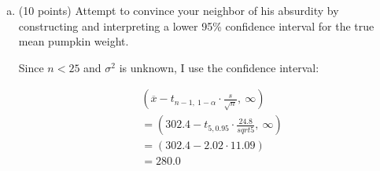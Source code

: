 \documentclass{article}\usepackage{graphicx, color}
\providecommand{\ov}[1]{\overline{#1}}
\numberwithin{equation}{section}
\begin{document}
\begin{flushleft}
\begin{enumerate}[1. ]
\begin{enumerate}[a. ]
{\color{red}

First, I calculate the mean weight to be:
\begin{align*}
\ov{x} &= \frac{1}{6} (311.0 + 271.1 + \cdots + 304.4) = 302.3
\intertext{and the standard deviation is:}
s &= \frac{1}{6-1}[(311.0 - 302.3)^2 + (271.1 - 302.3)^2 + \cdots + (304.4 - 302.3)^2] = 24.8
\end{align*}

And here is the hypothesis test:

\begin{enumerate}[1. ]
\item $H_0: \mu =240 $, $H_a: \mu \ne 240$, where $\mu $ is the true mean combined pumpkin weight.
\item $\alpha = 0.05$
\item I use the test statistic:
\begin{align*}
K = \frac{\ov{x} - 240}{s/\sqrt{n}}
\end{align*}
I assume the combined pumpkin weights are iid $N(\mu, \sigma^2)$. Under the additional assumption that $H_0$ is true, $K \sim t_{n - 1} = t_5$. I will reject $H_0$ if $|K| > t_{n - 1, 1 - \alpha/2} = t_{5, 0.975} = 2.57$
\item The moment of truth:
\begin{align*}
K &= \frac{302.3 - 240}{24.8/\sqrt{6}} = 6.15 \\
\end{align*} 
\item With $|K| = 6.15 > 2.57= t_{n - 1, 1 - \alpha/2}$, I reject $H_0$. 
\item There is enough evidence to conclude that your neighbor's true mean combined pumpkin weight (per year) is different from 240 lb.
\end{enumerate}

}




\item (10 points) Attempt to convince your neighbor of his absurdity by constructing and interpreting a lower 95\% confidence interval for the true mean pumpkin weight.


{\color{red}
Since $n < 25$ and $\sigma^2 $ is unknown, I use the confidence interval:

\begin{align*}
&(\ov{x} - t_{n - 1, \ 1 - \alpha} \cdot \frac{s}{\sqrt{n}}, \ \infty) \\
&= (302.4 - t_{5, 0.95} \cdot \frac{24.8}{sqrt{5}}, \ \infty) \\
& = (302.4 - 2.02 \cdot 11.09) \\
&= 280.0
\end{align*}

}
\end{enumerate}
\end{enumerate}
\end{flushleft}
\end{document}
